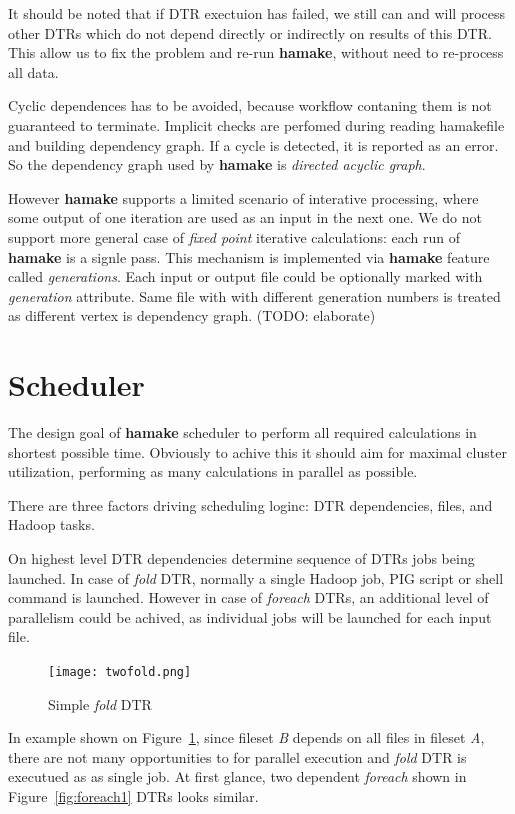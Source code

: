 \documentclass{article}
\begin{document}
It should be noted that if DTR exectuion has failed, we still can and
will process other DTRs which do not depend directly or indirectly on
results of this DTR. This allow us to fix the problem and re-run
\textbf{hamake}, without need to re-process all data.

Cyclic dependences has to be avoided, because workflow contaning them
is not guaranteed to terminate. Implicit checks are perfomed during
reading hamakefile and building dependency graph. If a cycle is
detected, it is reported as an error. So the dependency graph used by
\textbf{hamake} is \textit{directed acyclic graph}.

However \textbf{hamake} supports a limited scenario of interative processing,
where some output of one iteration are used as an input in the next
one. We do not support more general case of \textit{fixed point}
iterative calculations: each run of \textbf{hamake} is a signle pass. This
mechanism is implemented via \textbf{hamake} feature called
\textit{generations}. Each input or output file could be optionally
marked with \emph{generation} attribute. Same file with with different
generation numbers is treated as different vertex is dependency
graph. (TODO: elaborate)

\section{Scheduler}

The design goal of \textbf{hamake} scheduler to perform all required
calculations in shortest possible time. Obviously to achive this it
should aim for maximal cluster utilization, performing as many
calculations in parallel as possible.

There are three factors driving scheduling loginc: DTR dependencies,
files, and Hadoop tasks.

On highest level DTR dependencies determine sequence of DTRs jobs
being launched. In case of \emph{fold} DTR, normally a single Hadoop
job, PIG script or shell command is launched. However in case of
\emph{foreach} DTRs, an additional level of parallelism could be
achived, as individual jobs will be launched for each input file.

\begin{figure}[htp]
\centering
\texttt{[image: twofold.png]}
\caption{Simple \emph{fold} DTR}
\label{fig:fold1}
\end{figure}

In example shown on Figure~\ref{fig:fold1}, since fileset \textit{B}
depends on all files in fileset \textit{A}, there are not many
opportunities to for parallel execution and \emph{fold} DTR is
executued as as single job. At first glance, two dependent
\emph{foreach} shown in Figure~\ref{fig:foreach1} DTRs looks similar.
\end{document}
